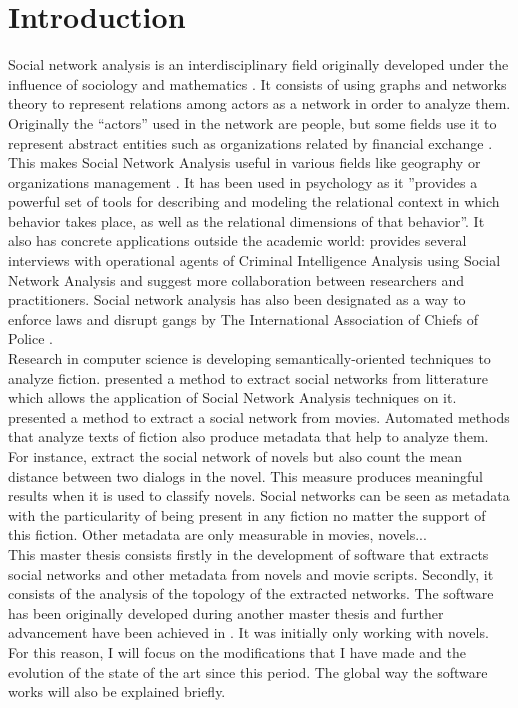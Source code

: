 \documentclass[a4paper, 12pt]{report}
\begin{document}
\chapter{Introduction}
Social network analysis is an interdisciplinary field originally developed under the influence of sociology and mathematics \citep{history_social}. It consists of using graphs and networks theory to represent relations among actors as a network in order to analyze them. Originally the ``actors'' used in the network are people, but some fields use it to represent abstract entities such as organizations related by financial exchange \citep{general_sna}. This makes Social Network Analysis useful in various fields like geography \citep{economic_geography} or organizations management \citep{management}. It has been used in psychology \citep{psy} as it ''provides a powerful set of tools for describing and modeling the relational context in which behavior takes place, as well as the relational dimensions of that behavior''\citep{intro}. It also has concrete applications outside the academic world: \cite{criminal} provides several interviews with operational agents of Criminal Intelligence Analysis using Social Network Analysis and suggest more collaboration between researchers and practitioners. Social network analysis has also been designated as a way to enforce laws and disrupt gangs by The International Association of Chiefs of Police \citep{police}. \\

Research in computer science is developing semantically-oriented techniques to analyze fiction. \cite{character_country} presented a method to extract social networks from litterature which allows the application of Social Network Analysis techniques on it. \cite{movie} presented a method to extract a social network from movies. Automated methods that analyze texts of fiction also produce metadata that help to analyze them. For instance, \cite{original} extract the social network of novels but also count the mean distance between two dialogs in the novel. This measure produces meaningful results when it is used to classify novels. Social networks can be seen as metadata with the particularity of being present in any fiction no matter the support of this fiction. Other metadata are only measurable in movies, novels... \\

This master thesis consists firstly in the development of software that extracts social networks and other metadata from novels and movie scripts. Secondly, it consists of the analysis of the topology of the extracted networks. The software has been originally developed during another master thesis \citep{original_thesis} and further advancement have been achieved in \cite{original}. It was initially only working with novels. For this reason, I will focus on the modifications that I have made and the evolution of the state of the art since this period. The global way the software works will also be explained briefly. \\
\end{document}
